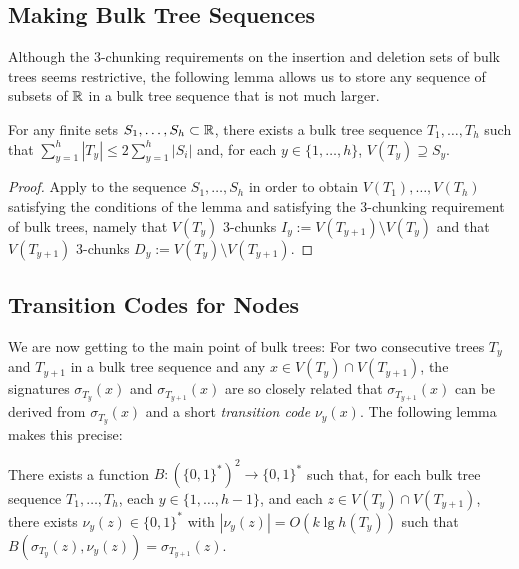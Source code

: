 \documentclass[kpfonts]{patmorin}
\let\le\leqslant
\begin{document}
\subsection{Making Bulk Tree Sequences}

Although the 3-chunking requirements on the insertion and deletion sets of bulk trees seems restrictive, the following lemma allows us to store any sequence of subsets of $\mathbb{R}$ in a bulk tree sequence that is not much larger.

\begin{lem}
  For any finite sets $S_1,\ldots,S_h\subset\mathbb{R}$, there exists a bulk tree sequence $T_1,\ldots,T_h$ such that $\sum_{y=1}^h |T_y|\le 2\sum_{y=1}^h |S_i|$ and, for each $y\in\{1,\ldots,h\}$, $V(T_y)\supseteq S_y$.
\end{lem}

\begin{proof}
  Apply  to the sequence $S_1,\ldots,S_h$ in order to obtain $V(T_1),\ldots,V(T_h)$ satisfying the conditions of the lemma and satisfying the 3-chunking requirement of bulk trees, namely that $V(T_y)$ 3-chunks $I_y:=V(T_{y+1})\setminus V(T_y)$ and that $V(T_{y+1})$ 3-chunks $D_y:=V(T_y)\setminus V(T_{y+1})$.
\end{proof}

\subsection{Transition Codes for Nodes}

We are now getting to the main point of bulk trees:  For two consecutive trees $T_y$ and $T_{y+1}$ in a bulk tree sequence and any $x\in V(T_y)\cap V(T_{y+1})$, the signatures $\sigma_{T_y}(x)$ and $\sigma_{T_{y+1}}(x)$ are so closely related that $\sigma_{T_{y+1}}(x)$ can be derived from $\sigma_{T_y}(x)$ and a short \emph{transition code} $\nu_y(x)$.  The following lemma makes this precise:

\begin{lem}
  There exists a function $B:(\{0,1\}^*)^2\to\{0,1\}^*$ such that, for each bulk tree sequence $T_1,\ldots,T_h$, each $y\in\{1,\ldots,h-1\}$, and each $z\in V(T_y)\cap V(T_{y+1})$, there exists $\nu_y(z)\in\{0,1\}^*$ with $|\nu_y(z)| = O(k\lg h(T_y))$ such that $B(\sigma_{T_y}(z), \nu_y(z)) = \sigma_{T_{y+1}}(z)$.  
\end{lem}
\end{document}
